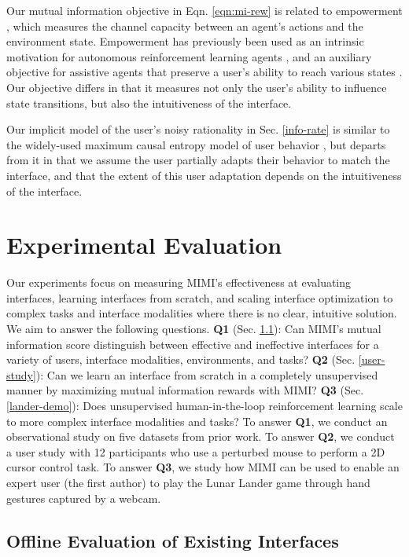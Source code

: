 \documentclass{article}
\begin{document}
Our mutual information objective in Eqn. \ref{eqn:mi-rew} is related to empowerment \cite{klyubin2005empowerment}, which measures the channel capacity between an agent's actions and the environment state.
Empowerment has previously been used as an intrinsic motivation for autonomous reinforcement learning agents \cite{mohamed2015variational}, and an auxiliary objective for assistive agents that preserve a user's ability to reach various states \cite{du2020ave}.
Our objective differs in that it measures not only the user's ability to influence state transitions, but also the intuitiveness of the interface.

Our implicit model of the user's noisy rationality in Sec. \ref{info-rate} is similar to the widely-used maximum causal entropy model of user behavior \cite{ziebart2010modeling}, but departs from it in that we assume the user partially adapts their behavior to match the interface, and that the extent of this user adaptation depends on the intuitiveness of the interface.

\section{Experimental Evaluation}

Our experiments focus on measuring MIMI's effectiveness at evaluating interfaces, learning interfaces from scratch, and scaling interface optimization to complex tasks and interface modalities where there is no clear, intuitive solution.
We aim to answer the following questions.
\textbf{Q1} (Sec. \ref{offline-eval}): Can MIMI's mutual information score distinguish between effective and ineffective interfaces for a variety of users, interface modalities, environments, and tasks?
\textbf{Q2} (Sec. \ref{user-study}): Can we learn an interface from scratch in a completely unsupervised manner by maximizing mutual information rewards with MIMI?
\textbf{Q3} (Sec. \ref{lander-demo}): Does unsupervised human-in-the-loop reinforcement learning scale to more complex interface modalities and tasks?
To answer \textbf{Q1}, we conduct an observational study on five datasets from prior work. 
To answer \textbf{Q2}, we conduct a user study with 12 participants who use a perturbed mouse to perform a 2D cursor control task.
To answer \textbf{Q3}, we study how MIMI can be used to enable an expert user (the first author) to play the Lunar Lander game through hand gestures captured by a webcam.

\subsection{Offline Evaluation of Existing Interfaces} \label{offline-eval}
\end{document}
